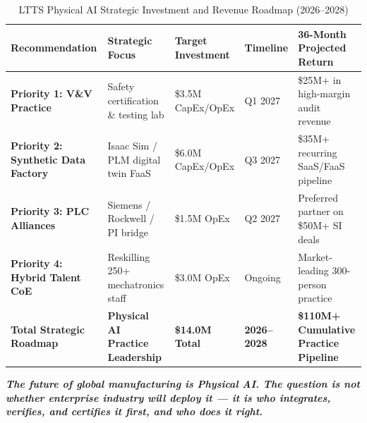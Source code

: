 \documentclass[11pt,a4paper]{article}
\begin{document}
\begin{table}[h!]
\centering
\scriptsize
\begin{tabularx}{\textwidth}{@{}l p{3.8cm} l l X@{}}
\toprule
\textbf{Recommendation} & \textbf{Strategic Focus} & \textbf{Target Investment} & \textbf{Timeline} & \textbf{36-Month Projected Return} \\
\midrule
\textbf{Priority 1: V\&V Practice} & Safety certification \& testing lab & \$3.5M CapEx/OpEx & Q1 2027 & \$25M+ in high-margin audit revenue \\
\textbf{Priority 2: Synthetic Data Factory} & Isaac Sim / PLM digital twin FaaS & \$6.0M CapEx/OpEx & Q3 2027 & \$35M+ recurring SaaS/FaaS pipeline \\
\textbf{Priority 3: PLC Alliances} & Siemens / Rockwell / PI bridge & \$1.5M OpEx & Q2 2027 & Preferred partner on \$50M+ SI deals \\
\textbf{Priority 4: Hybrid Talent CoE} & Reskilling 250+ mechatronics staff & \$3.0M OpEx & Ongoing & Market-leading 300-person practice \\
\midrule
\textbf{Total Strategic Roadmap} & \textbf{Physical AI Practice Leadership} & \textbf{\$14.0M Total} & \textbf{2026--2028} & \textbf{\$110M+ Cumulative Practice Pipeline} \\
\bottomrule
\end{tabularx}
\caption{LTTS Physical AI Strategic Investment and Revenue Roadmap (2026--2028)}
\end{table}

\vspace{0.4cm}
\begin{center}
\small\color{textdark}\textbf{\textit{The future of global manufacturing is Physical AI. The question is not whether enterprise industry will deploy it --- it is who integrates, verifies, and certifies it first, and who does it right.}}
\end{center}
\end{document}
